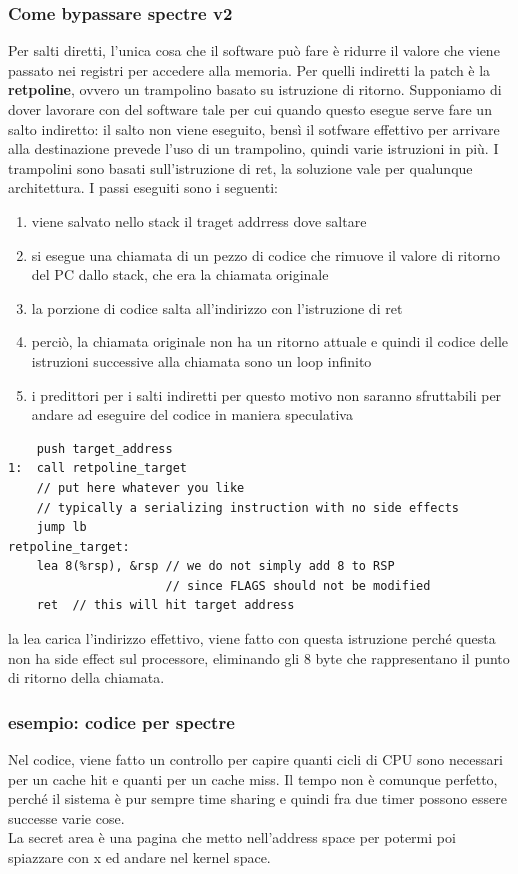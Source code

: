 \documentclass[14pt, oneside]{book}
\begin{document}
\subsubsection{Come bypassare spectre v2}
Per salti diretti, l'unica cosa che il software può fare è ridurre il valore che viene passato nei registri per accedere alla memoria. Per quelli indiretti la patch è la \textbf{retpoline}, ovvero un trampolino basato su istruzione di ritorno. Supponiamo di dover lavorare con del software tale per cui quando questo esegue serve fare un salto indiretto: il salto non viene eseguito, bensì il sotfware effettivo per arrivare alla destinazione prevede l'uso di un trampolino, quindi varie istruzioni in più. I trampolini sono basati sull'istruzione di \textsf{ret}, la soluzione vale per qualunque architettura. I passi eseguiti sono i seguenti:
\begin{enumerate}
\item viene salvato nello stack il traget addrress dove saltare
\item si esegue una chiamata di un pezzo di codice che rimuove il valore di ritorno del PC dallo stack, che era la chiamata originale
\item la porzione di codice salta all'indirizzo con l'istruzione di \textsf{ret}
\item perciò, la chiamata originale non ha un ritorno attuale e quindi il codice delle istruzioni successive alla chiamata sono un loop infinito
\item i predittori per i salti indiretti per questo motivo non saranno sfruttabili per andare ad eseguire del codice in maniera speculativa
\end{enumerate}
\begin{lstlisting}
	push target_address
1:	call retpoline_target
	// put here whatever you like
	// typically a serializing instruction with no side effects
	jump lb
retpoline_target:
	lea 8(%rsp), &rsp // we do not simply add 8 to RSP
					  // since FLAGS should not be modified
	ret  // this will hit target address
\end{lstlisting}
la \textsf{lea} carica l'indirizzo effettivo, viene fatto con questa istruzione perché questa non ha side effect sul processore, eliminando gli 8 byte che rappresentano il punto di ritorno della chiamata.\\ 
\subsubsection{esempio: codice per spectre}
Nel codice, viene fatto un controllo per capire quanti cicli di CPU sono necessari per un cache hit e quanti per un cache miss. Il tempo non è comunque perfetto, perché il sistema è pur sempre time sharing e quindi fra due timer possono essere successe varie cose.\\ La secret area è una pagina che metto nell'address space per potermi poi spiazzare con x ed andare nel kernel space.
\end{document}
